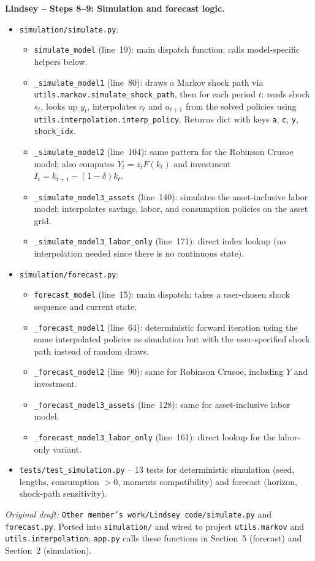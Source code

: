 \documentclass[11pt]{article}
\begin{document}
\begin{intuitbox}
\medskip
\textbf{Lindsey -- Steps 8--9: Simulation and forecast logic.}
\begin{itemize}
    \item \texttt{simulation/simulate.py}:
    \begin{itemize}
        \item \texttt{simulate\_model} (line~19): main dispatch function; calls model-specific helpers below.
        \item \texttt{\_simulate\_model1} (line~80): draws a Markov shock path via \texttt{utils.markov.simulate\_shock\_path}, then for each period $t$: reads shock $s_t$, looks up $y_t$, interpolates $c_t$ and $a_{t+1}$ from the solved policies using \texttt{utils.interpolation.interp\_policy}. Returns dict with keys \texttt{a}, \texttt{c}, \texttt{y}, \texttt{shock\_idx}.
        \item \texttt{\_simulate\_model2} (line~104): same pattern for the Robinson Crusoe model; also computes $Y_t = z_t F(k_t)$ and investment $I_t = k_{t+1} - (1-\delta)k_t$.
        \item \texttt{\_simulate\_model3\_assets} (line~140): simulates the asset-inclusive labor model; interpolates savings, labor, and consumption policies on the asset grid.
        \item \texttt{\_simulate\_model3\_labor\_only} (line~171): direct index lookup (no interpolation needed since there is no continuous state).
    \end{itemize}
    \item \texttt{simulation/forecast.py}:
    \begin{itemize}
        \item \texttt{forecast\_model} (line~15): main dispatch; takes a user-chosen shock sequence and current state.
        \item \texttt{\_forecast\_model1} (line~64): deterministic forward iteration using the same interpolated policies as simulation but with the user-specified shock path instead of random draws.
        \item \texttt{\_forecast\_model2} (line~90): same for Robinson Crusoe, including $Y$ and investment.
        \item \texttt{\_forecast\_model3\_assets} (line~128): same for asset-inclusive labor model.
        \item \texttt{\_forecast\_model3\_labor\_only} (line~161): direct lookup for the labor-only variant.
    \end{itemize}
    \item \texttt{tests/test\_simulation.py} -- 13 tests for deterministic simulation (seed, lengths, consumption $>0$, moments compatibility) and forecast (horizon, shock-path sensitivity).
\end{itemize}
\textit{Original draft:} \texttt{Other member's work/Lindsey code/simulate.py} and \texttt{forecast.py}. Ported into \texttt{simulation/} and wired to project \texttt{utils.markov} and \texttt{utils.interpolation}; \texttt{app.py} calls these functions in Section~5 (forecast) and Section~2 (simulation).


\end{intuitbox}
\end{document}
